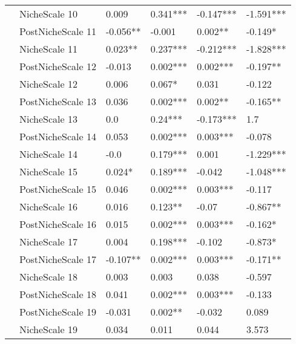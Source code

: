 \begin{longtable}[h!]{llllll}
     & NicheScale 10 &               0.009 &    0.341*** &  -0.147*** &  -1.591*** \\
     & PostNicheScale 11 &            -0.056** &      -0.001 &    0.002** &    -0.149* \\
     & NicheScale 11 &             0.023** &    0.237*** &  -0.212*** &  -1.828*** \\
     & PostNicheScale 12 &              -0.013 &    0.002*** &   0.002*** &   -0.197** \\
     & NicheScale 12 &               0.006 &      0.067* &      0.031 &     -0.122 \\
     & PostNicheScale 13 &               0.036 &    0.002*** &    0.002** &   -0.165** \\
     & NicheScale 13 &                 0.0 &     0.24*** &  -0.173*** &        1.7 \\
     & PostNicheScale 14 &               0.053 &    0.002*** &   0.003*** &     -0.078 \\
     & NicheScale 14 &                -0.0 &    0.179*** &      0.001 &  -1.229*** \\
     & NicheScale 15 &              0.024* &    0.189*** &     -0.042 &  -1.048*** \\
     & PostNicheScale 15 &               0.046 &    0.002*** &   0.003*** &     -0.117 \\
     & NicheScale 16 &               0.016 &     0.123** &      -0.07 &   -0.867** \\
     & PostNicheScale 16 &               0.015 &    0.002*** &   0.003*** &    -0.162* \\
     & NicheScale 17 &               0.004 &    0.198*** &     -0.102 &    -0.873* \\
     & PostNicheScale 17 &            -0.107** &    0.002*** &   0.003*** &   -0.171** \\
     & NicheScale 18 &               0.003 &       0.003 &      0.038 &     -0.597 \\
     & PostNicheScale 18 &               0.041 &    0.002*** &   0.003*** &     -0.133 \\
     & PostNicheScale 19 &              -0.031 &     0.002** &     -0.032 &      0.089 \\
     & NicheScale 19 &               0.034 &       0.011 &      0.044 &      3.573 \\
\end{longtable}
